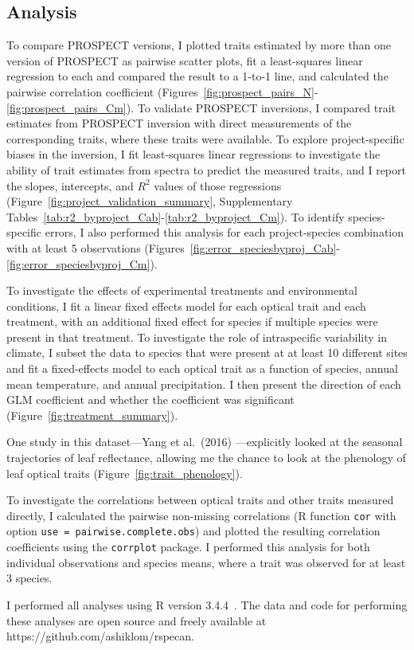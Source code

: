 \subsection{Analysis}

To compare PROSPECT versions, I plotted traits estimated by more than one version of PROSPECT as pairwise scatter plots, fit a least-squares linear regression to each and compared the result to a 1-to-1 line, and calculated the pairwise correlation coefficient (Figures~\ref{fig:prospect_pairs_N}-\ref{fig:prospect_pairs_Cm}).
% 
% 
To validate PROSPECT inversions, I compared trait estimates from PROSPECT inversion with direct measurements of the corresponding traits, where these traits were available.
To explore project-specific biases in the inversion, I fit least-squares linear regressions to investigate the ability of trait estimates from spectra to predict the measured traits, and I report the slopes, intercepts, and $R^2$ values of those regressions (Figure~\ref{fig:project_validation_summary}, Supplementary Tables~\ref{tab:r2_byproject_Cab}-\ref{tab:r2_byproject_Cm}).
To identify species-specific errors, I also performed this analysis for each project-species combination with at least 5 observations (Figures~\ref{fig:error_speciesbyproj_Cab}-\ref{fig:error_speciesbyproj_Cm}).

To investigate the effects of experimental treatments and environmental conditions, I fit a linear fixed effects model for each optical trait and each treatment, with an additional fixed effect for species if multiple species were present in that treatment.
To investigate the role of intraspecific variability in climate, I subset the data to species that were present at at least 10 different sites and fit a fixed-effects model to each optical trait as a function of species, annual mean temperature, and annual precipitation.
I then present the direction of each GLM coefficient and whether the coefficient was significant (Figure~\ref{fig:treatment_summary}).

One study in this dataset---Yang et al.~(2016) \nocite{yang_2016_seasonal}---explicitly looked at the seasonal trajectories of leaf reflectance, allowing me the chance to look at the phenology of leaf optical traits (Figure~\ref{fig:trait_phenology}).

To investigate the correlations between optical traits and other traits measured directly, I calculated the pairwise non-missing correlations (R function \texttt{cor} with option \texttt{use = pairwise.complete.obs}) and plotted the resulting correlation coefficients using the \texttt{corrplot} package.
I performed this analysis for both individual observations and species means, where a trait was observed for at least 3 species.

I performed all analyses using R version 3.4.4~\cite{rstats}.
The data and code for performing these analyses are open source and freely available at https://github.com/ashiklom/rspecan.
